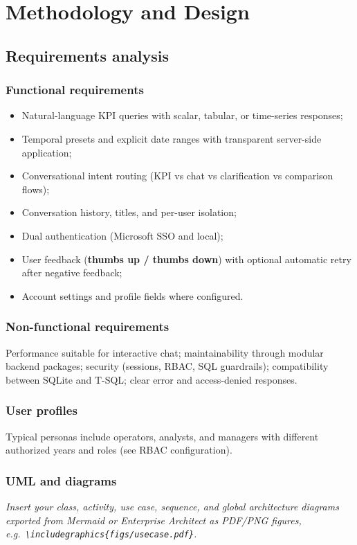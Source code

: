 \chapter{Methodology and Design}

\section{Requirements analysis}
\subsection{Functional requirements}
\begin{itemize}[leftmargin=*]
  \item Natural-language KPI queries with scalar, tabular, or time-series responses;
  \item Temporal presets and explicit date ranges with transparent server-side application;
  \item Conversational intent routing (KPI vs chat vs clarification vs comparison flows);
  \item Conversation history, titles, and per-user isolation;
  \item Dual authentication (Microsoft SSO and local);
  \item User feedback (\textbf{thumbs up / thumbs down}) with optional automatic retry after negative feedback;
  \item Account settings and profile fields where configured.
\end{itemize}

\subsection{Non-functional requirements}
Performance suitable for interactive chat; maintainability through modular backend packages; security (sessions, RBAC, SQL guardrails); compatibility between SQLite and T-SQL; clear error and access-denied responses.

\subsection{User profiles}
Typical personas include operators, analysts, and managers with different authorized years and roles (see RBAC configuration).

\subsection{UML and diagrams}
\textit{Insert your class, activity, use case, sequence, and global architecture diagrams exported from Mermaid or Enterprise Architect as PDF/PNG figures, e.g.\ \texttt{\textbackslash includegraphics\{figs/usecase.pdf\}}.}

